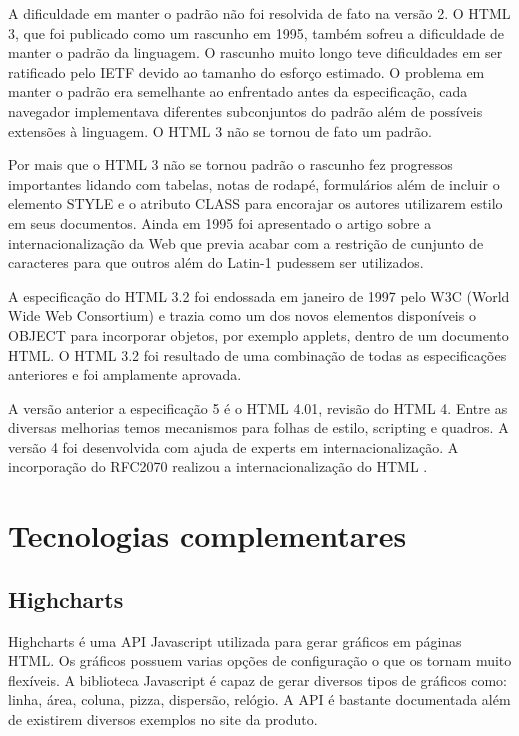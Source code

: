 A dificuldade em manter o padrão não foi resolvida de fato na versão 2. O HTML 3, que foi publicado como um rascunho em 1995, também sofreu a dificuldade de manter o padrão da linguagem. O rascunho muito longo teve dificuldades em ser ratificado pelo IETF devido ao tamanho do esforço estimado. O problema em manter o padrão era semelhante ao enfrentado antes da especificação, cada navegador implementava diferentes subconjuntos do padrão além de possíveis extensões à linguagem. O HTML 3 não se tornou de fato um padrão.

Por mais que o HTML 3 não se tornou padrão o rascunho fez progressos importantes lidando com tabelas, notas de rodapé, formulários além de incluir o elemento STYLE e o atributo CLASS para encorajar os autores utilizarem estilo em seus documentos. Ainda em 1995 foi apresentado o artigo sobre a internacionalização da Web que previa acabar com a restrição de cunjunto de caracteres para que outros além do Latin-1 pudessem ser utilizados.

A especificação do HTML 3.2 foi endossada em janeiro de 1997 pelo W3C (World Wide Web Consortium) e trazia como um dos novos elementos disponíveis o OBJECT para incorporar objetos, por exemplo applets, dentro de um documento HTML. O HTML 3.2 foi resultado de uma combinação de todas as especificações anteriores e foi amplamente aprovada. \cite{htmlHist}

A versão anterior a especificação 5 é o HTML 4.01, revisão do HTML 4. Entre as diversas melhorias temos mecanismos para folhas de estilo, scripting e quadros. A versão 4 foi desenvolvida com ajuda de experts em internacionalização. A incorporação do RFC2070 realizou a internacionalização do HTML \cite{html4Int}.

\chapter{Tecnologias complementares}

\section{Highcharts}
Highcharts é uma API Javascript utilizada para gerar gráficos em páginas HTML. Os gráficos possuem varias opções de configuração o que os tornam muito flexíveis. A biblioteca Javascript é capaz de gerar diversos tipos de gráficos como: linha, área, coluna, pizza, dispersão, relógio. A API é bastante documentada além de existirem diversos exemplos no site da produto.

